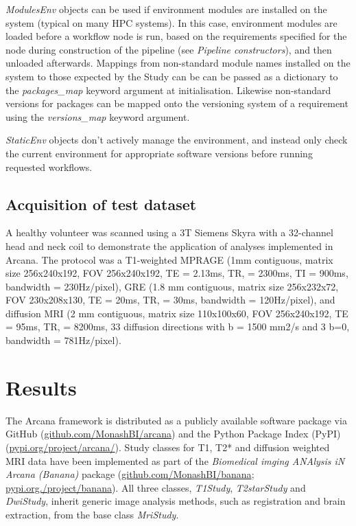 \documentclass[smallextended]{svjour3}       %
\begin{document}
\emph{ModulesEnv} objects can be used if environment
modules \citep{furlani_modules:_1991} are installed on the system (typical on many
HPC systems). In this case, environment modules are loaded before a workflow node is run,
based on the requirements specified for the node during construction of the pipeline
(see \emph{Pipeline constructors}), and then unloaded afterwards. Mappings from non-standard
module names installed on the system to those expected by the Study can be
can be passed as a dictionary to the \emph{packages\_map} keyword argument
at initialisation. Likewise non-standard versions for packages can be mapped
onto the versioning system of a requirement using the \emph{versions\_map}
keyword argument.

\emph{StaticEnv} objects don't actively manage the environment,
and instead only check the current environment for appropriate software
versions before running requested workflows.

\subsection*{Acquisition of test dataset}

A healthy volunteer was scanned using a 3T Siemens Skyra with a 32-channel head
and neck coil to demonstrate the application of analyses implemented in
Arcana. The protocol was a T1-weighted MPRAGE (1mm contiguous,
matrix size 256x240x192, FOV 256x240x192, TE = 2.13ms, TR, = 2300ms, TI
= 900ms, bandwidth = 230Hz/pixel), GRE (1.8 mm contiguous, matrix size
256x232x72, FOV 230x208x130, TE = 20ms, TR, = 30ms,
bandwidth = 120Hz/pixel), and diffusion MRI (2 mm contiguous, matrix size
110x100x60, FOV 256x240x192, TE = 95ms, TR, = 8200ms, 33 diffusion
directions with b = 1500 mm2/s and 3 b=0, bandwidth = 781Hz/pixel).

\section*{Results}
\label{results}

The Arcana framework is distributed as a publicly available software
package via GitHub (\url{github.com/MonashBI/arcana}) and the
Python Package Index (PyPI) (\url{pypi.org/project/arcana/}).
Study classes for T1, T2* and diffusion weighted MRI data have been
implemented as part of the \emph{Biomedical imging ANAlysis iN Arcana (Banana)} package
(\url{github.com/MonashBI/banana}; \url{pypi.org./project/banana}).
All three classes, \emph{T1Study}, \emph{T2starStudy} and
\emph{DwiStudy}, inherit generic image analysis methods, such as
registration and brain extraction, from the base class \emph{MriStudy}.
\end{document}
